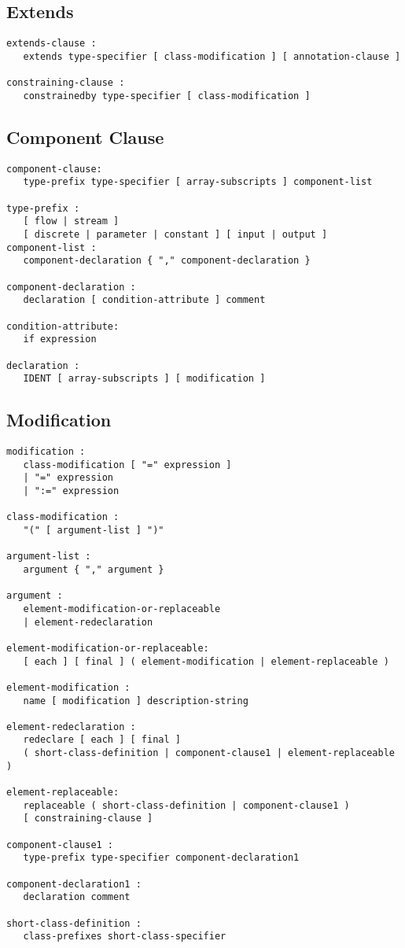\subsection{Extends}
\begin{lstlisting}[language=grammar]
extends-clause :
   extends type-specifier [ class-modification ] [ annotation-clause ]

constraining-clause :
   constrainedby type-specifier [ class-modification ]
\end{lstlisting}

\subsection{Component Clause}
\begin{lstlisting}[language=grammar]
component-clause:
   type-prefix type-specifier [ array-subscripts ] component-list

type-prefix :
   [ flow | stream ]
   [ discrete | parameter | constant ] [ input | output ]
component-list :
   component-declaration { "," component-declaration }

component-declaration :
   declaration [ condition-attribute ] comment

condition-attribute:
   if expression

declaration :
   IDENT [ array-subscripts ] [ modification ]
\end{lstlisting}

\subsection{Modification}
\begin{lstlisting}[language=grammar]
modification :
   class-modification [ "=" expression ]
   | "=" expression
   | ":=" expression

class-modification :
   "(" [ argument-list ] ")"

argument-list :
   argument { "," argument }

argument :
   element-modification-or-replaceable
   | element-redeclaration

element-modification-or-replaceable:
   [ each ] [ final ] ( element-modification | element-replaceable )

element-modification :
   name [ modification ] description-string

element-redeclaration :
   redeclare [ each ] [ final ]
   ( short-class-definition | component-clause1 | element-replaceable )

element-replaceable:
   replaceable ( short-class-definition | component-clause1 )
   [ constraining-clause ]

component-clause1 :
   type-prefix type-specifier component-declaration1

component-declaration1 :
   declaration comment

short-class-definition :
   class-prefixes short-class-specifier
\end{lstlisting}

